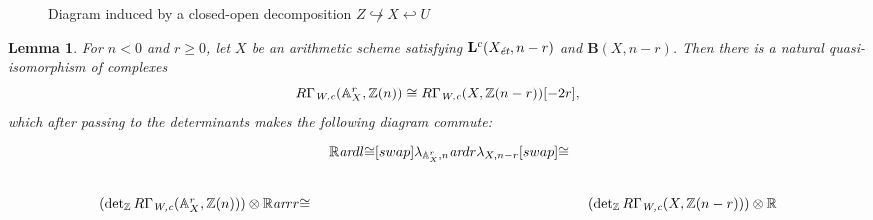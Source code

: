 \documentclass[10pt,a4paper,oneside]{article}
\newcommand{\RR}{\mathbb{R}}
\newcommand{\ZZ}{\mathbb{Z}}
\renewcommand{\AA}{\mathbb{A}}
\renewcommand{\det}{\operatorname{det}}
\newcommand{\ar}{\text{\it ar}}
\newcommand{\et}{\text{\it \'{e}t}}
\newcommand{\Wc}{\text{\it W,c}}
\theoremstyle{myplain}
\newtheorem{lemma}[theorem]{Lemma}
\theoremstyle{mydefinition}
\numberwithin{equation}{section}
\begin{document}
\begin{landscape}
\begin{figure}
    \caption{Diagram induced by a closed-open decomposition
      $Z \not\hookrightarrow X \hookleftarrow U$}
    \label{fig:Regulators-and-closed-open-decompositions}
  \end{figure}
\end{landscape}

\begin{lemma}
  \label{lemma:lambda-and-affine-bundles}
  For $n < 0$ and $r \ge 0$, let $X$ be an arithmetic scheme satisfying
  $\mathbf{L}^c (X_\et,n-r)$ and $\mathbf{B} (X,n-r)$. Then there is a natural
  quasi-isomorphism of complexes
  \begin{equation}
    \label{eqn:RGamma-Wc-and-affine-bundles}
    R\Gamma_\Wc (\AA^r_X, \ZZ (n)) \cong R\Gamma_\Wc (X, \ZZ (n-r)) [-2r],
  \end{equation}
  which after passing to the determinants makes the following diagram commute:
  \begin{equation}
    \label{eqn:lambda-and-affine-bundles}
    \begin{tikzcd}[column sep=0.5em]
    & \RR\ar{dl}{\cong}[swap]{\lambda_{\AA^r_X,n}}\ar{dr}{\lambda_{X,n-r}}[swap]{\cong} \\
      (\det_\ZZ R\Gamma_\Wc (\AA^r_X, \ZZ (n)))\otimes \RR \ar{rr}{\cong} & & (\det_\ZZ R\Gamma_\Wc (X, \ZZ (n-r)))\otimes \RR
    \end{tikzcd}
  \end{equation}


\end{lemma}
\end{document}
